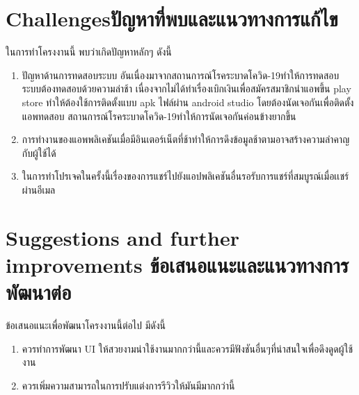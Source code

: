 \section{\ifenglish Challenges\else ปัญหาที่พบและแนวทางการแก้ไข\fi}

ในการทำโครงงานนี้ พบว่าเกิดปัญหาหลักๆ ดังนี้
\begin{enumerate}
    \item ปัญหาด้านการทดสอบระบบ อันเนื่องมาจากสถานการณ์โรคระบาดโควิด-19ทำให้การทดสอบระบบต้องทดสอบด้วยความล่าช้า
    เนื่องจากไม่ได้ทำเรื่องเบิกเงินเพื่อสมัครสมาชิกนำแอพขึ้น play store ทำให้ต้องใช้การติดตั้งแบบ apk ไฟล์ผ่าน android studio
    โดยต้องนัดเจอกันเพื่อติดตั้งแอพทดสอบ สถานการณ์โรคระบาดโควิด-19ทำให้การนัดเจอกันค่อนข้างยากขึ้น
    \item การทำงานของแอพพลิเคชันเมื่อมีอินเตอร์เน็ตที่ช้าทำให้การดึงข้อมูลช้าตามอาจสร้างความลำคาญกับผู้ใช้ได้
    \item ในการทำโปรเจคในครั้งนี้เรื่องของการแชร์ไปยังแอปพลิเคชันอื่นรอรับการแชร์ที่สมบูรณ์เมื่อเเชร์ผ่านอีเมล
\end{enumerate}
\section{\ifenglish%
Suggestions and further improvements
\else%
ข้อเสนอแนะและแนวทางการพัฒนาต่อ
\fi
}

ข้อเสนอแนะเพื่อพัฒนาโครงงานนี้ต่อไป มีดังนี้
\begin{enumerate}
    \item ควรทำการพัฒนา UI ให้สวยงามน่าใช้งานมากกว่านี้และควรมีฟังชันอื่นๆที่น่าสนใจเพื่อดึงดูดผู้ใช้งาน
    \item ควรเพิ่มความสามารถในการปรับแต่งการรีวิวให้มันมีมากกว่านี้
\end{enumerate}
